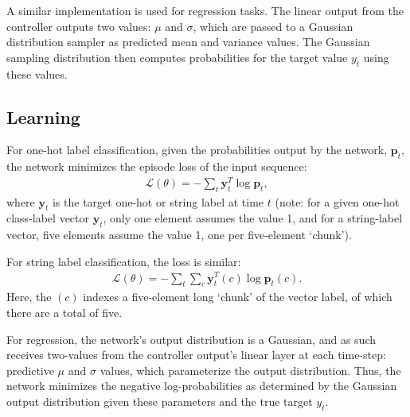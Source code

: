 \documentclass{article}
\begin{document}
A similar implementation is used for regression tasks. The linear output from the controller outputs two values: $\mu$ and $\sigma$, which are passed to a Gaussian distribution sampler as predicted mean and variance values. The Gaussian sampling distribution then computes probabilities for the target value $y_t$ using these values.

\subsection{Learning}
For one-hot label classification, given the probabilities output by the network, $\mathbf{p}_t$, the network minimizes the episode loss of the input sequence:
\begin{align}
    \mathcal{L}(\theta) = - \sum_t \mathbf{y}_t^{T} \log \mathbf{p}_t,
\end{align}
where $\mathbf{y}_t$ is the target one-hot or string label at time $t$ (note: for a given one-hot class-label vector $\mathbf{y}_t$, only one element assumes the value 1, and for a string-label vector, five elements assume the value 1, one per five-element `chunk').

For string label classification, the loss is similar:
\begin{align}
    \mathcal{L}(\theta) = - \sum_t \sum_c \mathbf{y}_t^{T}(c) \log \mathbf{p}_t(c).
\end{align}
Here, the $(c)$ indexes a five-element long `chunk' of the vector label, of which there are a total of five.

For regression, the network's output distribution is a Gaussian, and as such receives two-values from the controller output's linear layer at each time-step: predictive $\mu$ and $\sigma$ values, which parameterize the output distribution. Thus, the network minimizes the negative log-probabilities as determined by the Gaussian output distribution given these parameters and the true target $y_t$.
\end{document}
